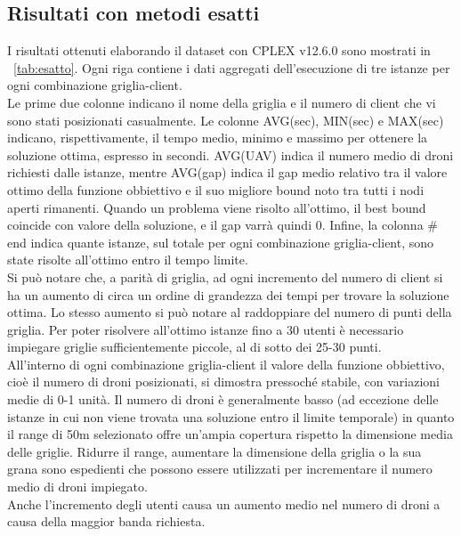 \subsection{Risultati con metodi esatti} \label{sec:esatti}
I risultati ottenuti elaborando il dataset con CPLEX v12.6.0 sono mostrati in \tablename\ \ref{tab:esatto}.
Ogni riga contiene i dati aggregati dell'esecuzione di tre istanze per ogni combinazione griglia-client. \\
Le prime due colonne indicano il nome della griglia e il numero di client che vi sono stati posizionati casualmente. Le colonne AVG(sec), MIN(sec) e MAX(sec) indicano, rispettivamente, il tempo medio, minimo e massimo per ottenere la soluzione ottima, espresso in secondi. AVG(UAV) indica il numero medio di droni richiesti dalle istanze, mentre AVG(gap) indica il gap medio relativo tra il valore ottimo della funzione obbiettivo e il suo migliore bound noto tra tutti i nodi aperti rimanenti. Quando un problema viene risolto all'ottimo, il best bound coincide con valore della soluzione, e il gap varrà quindi 0. Infine, la colonna \# end indica quante istanze, sul totale per ogni combinazione griglia-client, sono state risolte all'ottimo entro il tempo limite. \\
Si può notare che, a parità di griglia, ad ogni incremento del numero di client si ha un aumento di circa un ordine di grandezza dei tempi per trovare la soluzione ottima. 
Lo stesso aumento si può notare al raddoppiare del numero di punti della griglia. Per poter risolvere all'ottimo istanze fino a 30 utenti è necessario impiegare griglie sufficientemente piccole, al di sotto dei 25-30 punti. \\
All'interno di ogni combinazione griglia-client il valore della funzione obbiettivo, cioè il numero di droni posizionati, si dimostra pressoché stabile, con variazioni medie di 0-1 unità. Il numero di droni è generalmente basso (ad eccezione delle istanze in cui non viene trovata una soluzione entro il limite temporale) in quanto il range di 50m selezionato offre un'ampia copertura rispetto la dimensione media delle griglie. Ridurre il range, aumentare la dimensione della griglia o la sua grana sono espedienti che possono essere utilizzati per incrementare il numero medio di droni impiegato.\\
Anche l'incremento degli utenti causa un aumento medio nel numero di droni a causa della maggior banda richiesta. \\ 
%
\setlength{\tabcolsep}{3.5 pt}
\renewcommand\arraystretch{1.1}
